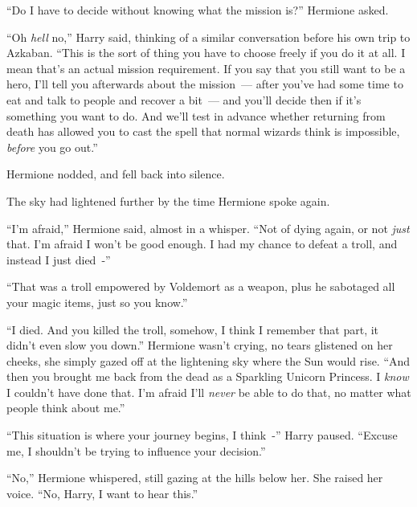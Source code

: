 ``Do I have to decide without knowing what the mission is?'' Hermione asked.

``Oh \emph{hell} no,'' Harry said, thinking of a similar conversation before his own trip to Azkaban. ``This is the sort of thing you have to choose freely if you do it at all. I mean that's an actual mission requirement. If you say that you still want to be a hero, I'll tell you afterwards about the mission~--- after you've had some time to eat and talk to people and recover a bit~--- and you'll decide then if it's something you want to do. And we'll test in advance whether returning from death has allowed you to cast the spell that normal wizards think is impossible, \emph{before} you go out.''

Hermione nodded, and fell back into silence.

The sky had lightened further by the time Hermione spoke again.

``I'm afraid,'' Hermione said, almost in a whisper. ``Not of dying again, or not \emph{just} that. I'm afraid I won't be good enough. I had my chance to defeat a troll, and instead I just died~-''

``That was a troll empowered by Voldemort as a weapon, plus he sabotaged all your magic items, just so you know.''

``I died. And you killed the troll, somehow, I think I remember that part, it didn't even slow you down.'' Hermione wasn't crying, no tears glistened on her cheeks, she simply gazed off at the lightening sky where the Sun would rise. ``And then you brought me back from the dead as a Sparkling Unicorn Princess. I \emph{know} I couldn't have done that. I'm afraid I'll \emph{never} be able to do that, no matter what people think about me.''

``This situation is where your journey begins, I think~-'' Harry paused. ``Excuse me, I shouldn't be trying to influence your decision.''

``No,'' Hermione whispered, still gazing at the hills below her. She raised her voice. ``No, Harry, I want to hear this.''

